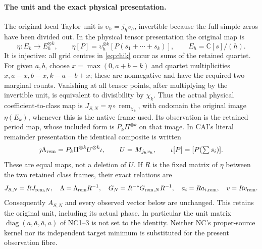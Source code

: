 \documentclass[11pt]{article}
\newcommand{\C}{\mathbb C}
\newcommand{\remm}{\operatorname{rem}}
\begin{document}
\paragraph{The unit and the exact physical presentation.}
The original local Taylor unit is $\upsilon_h=j_hv_h$, invertible
because the full simple zeros have been divided out.  In the physical
tensor presentation the original map is
\[
 \eta:E_k\longrightarrow E_h^{\otimes k},\qquad
 \eta[P]=\upsilon_h^{\otimes k}[P(s_1+\cdots+s_k)],
 \qquad E_h=\C[s]/(h).
\]
It is injective: all grid centres in \eqref{eq:chik} occur as sums of
the retained quartet.  For given $a,b$, choose $x=\max(0,a+b-k)$
and quartet multiplicities $x,a-x,b-x,k-a-b+x$; these are nonnegative
and have the required two marginal counts.  Vanishing at all tensor
points, after multiplying
by the invertible unit, is equivalent to divisibility by $\chi_k$.
Thus the actual physical coefficient-to-class map is
$J_{S,N}=\eta\circ\remm_{\chi_k}$, with codomain the original image
$\eta(E_k)$, whenever this is the native frame used.  Its observation
is the retained period map, whose included form is
$P_k\Pi^{\otimes k}$ on that image.  In CAI's literal remainder
presentation the identical composite is written
\[
 \jmath\Lambda_{\rm rem}
 =P_k\Pi^{\otimes k}U^{\otimes k}\iota,
 \qquad U=M_{j_hv_h},\qquad \iota[P]=[P(\textstyle\sum s_i)].
\]
These are equal maps, not a deletion of $U$.  If $R$ is the fixed
matrix of $\eta$ between the two retained class frames, their exact
relations are
\begin{equation}\label{eq:unitframe}
 J_{S,N}=R J_{{\rm rem},N},\quad
 \Lambda=\Lambda_{\rm rem}R^{-1},\quad
 G_N=R^{-*}G_{{\rm rem},N}R^{-1},\quad
 a_i=R a_{i,\rm rem},\quad v=Rv_{\rm rem}.
\end{equation}
Consequently $A_{S,N}$ and every observed vector below are unchanged.
This retains the original unit, including its actual phase.  In
particular the unit matrix $\operatorname{diag}(a,\bar a,\bar a,a)$
of NC1--3 \cite{NC} is not set to the identity.  Neither NC's
proper-source kernel nor its independent target minimum is substituted
for the present observation fibre.
\end{document}
